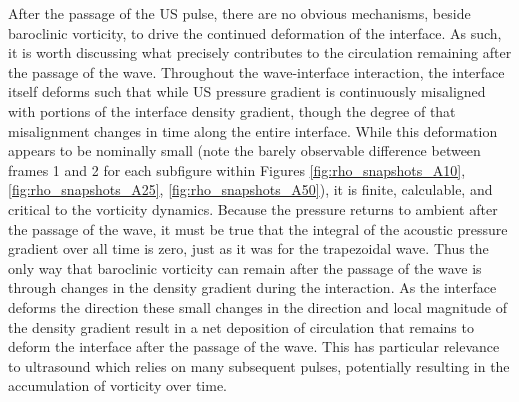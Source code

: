 After the passage of the \ac{US} pulse, there are no obvious
mechanisms, beside baroclinic vorticity, to drive the continued
deformation of the interface. As such, it is worth discussing what
precisely contributes to the circulation remaining after the passage
of the wave. Throughout the wave-interface interaction, the interface
itself deforms such that while \ac{US} pressure gradient is
continuously misaligned with portions of the interface density
gradient, though the degree of that misalignment changes in time along
the entire interface. While this deformation appears to be nominally
small (note the barely observable difference between frames 1 and 2
for each subfigure within Figures \ref{fig:rho_snapshots_A10},
\ref{fig:rho_snapshots_A25}, \ref{fig:rho_snapshots_A50}), it is
finite, calculable, and critical to the vorticity dynamics. Because
the pressure returns to ambient after the passage of the wave, it must
be true that the integral of the acoustic pressure gradient over all
time is zero, just as it was for the trapezoidal wave. Thus the only
way that baroclinic vorticity can remain after the passage of the wave
is through changes in the density gradient during the interaction. As the interface deforms
the direction these small changes in the direction and local magnitude
of the density gradient result in a net deposition of circulation that
remains to deform the interface after the passage of the wave. This
has particular relevance to ultrasound which relies on many subsequent
pulses, potentially resulting in the accumulation of vorticity over
time.
% 

